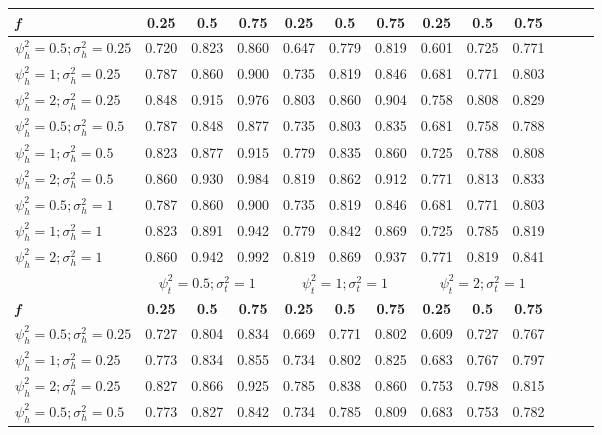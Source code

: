 \begin{table}[ht]
{\begin{tabular}{l c c c c c c c c c c c c}
\cmidrule(lr){2-4} \cmidrule(lr){5-7} \cmidrule(lr){8-10}
\textbf{\textit{f}} & \textbf{0.25} & \textbf{0.5} & \textbf{0.75} & \textbf{0.25} & \textbf{0.5} & \textbf{0.75} & \textbf{0.25} & \textbf{0.5} & \textbf{0.75} \\
\hline
$\psi_h^2 = 0.5; \sigma_h^2 = 0.25$ & 0.720 & 0.823 & 0.860 & 0.647 & 0.779 & 0.819 & 0.601 & 0.725 & 0.771 \\
$\psi_h^2 = 1; \sigma_h^2 = 0.25$ & 0.787 & 0.860 & 0.900 & 0.735 & 0.819 & 0.846 & 0.681 & 0.771 & 0.803 \\
$\psi_h^2 = 2; \sigma_h^2 = 0.25$ & 0.848 & 0.915 & 0.976 & 0.803 & 0.860 & 0.904 & 0.758 & 0.808 & 0.829 \\
$\psi_h^2 = 0.5; \sigma_h^2 = 0.5$ & 0.787 & 0.848 & 0.877 & 0.735 & 0.803 & 0.835 & 0.681 & 0.758 & 0.788 \\
$\psi_h^2 = 1; \sigma_h^2 = 0.5$ & 0.823 & 0.877 & 0.915 & 0.779 & 0.835 & 0.860 & 0.725 & 0.788 & 0.808 \\
$\psi_h^2 = 2; \sigma_h^2 = 0.5$ & 0.860 & 0.930 & 0.984 & 0.819 & 0.862 & 0.912 & 0.771 & 0.813 & 0.833 \\
$\psi_h^2 = 0.5; \sigma_h^2 = 1$ & 0.787 & 0.860 & 0.900 & 0.735 & 0.819 & 0.846 & 0.681 & 0.771 & 0.803 \\
$\psi_h^2 = 1; \sigma_h^2 = 1$ & 0.823 & 0.891 & 0.942 & 0.779 & 0.842 & 0.869 & 0.725 & 0.785 & 0.819 \\
$\psi_h^2 = 2; \sigma_h^2 = 1$ & 0.860 & 0.942 & 0.992 & 0.819 & 0.869 & 0.937 & 0.771 & 0.819 & 0.841 \\
\hline 
 & \multicolumn{3}{c}{$\psi_t^2 = 0.5; \sigma_t^2 = 1$} & \multicolumn{3}{c}{$\psi_t^2 = 1; \sigma_t^2 = 1$} & \multicolumn{3}{c}{$\psi_t^2 = 2; \sigma_t^2 = 1$} \\
\addlinespace[1pt]
\cmidrule(lr){2-4} \cmidrule(lr){5-7} \cmidrule(lr){8-10}
\addlinespace[1pt]
\textbf{\textit{f}} & \textbf{0.25} & \textbf{0.5} & \textbf{0.75} & \textbf{0.25} & \textbf{0.5} & \textbf{0.75} & \textbf{0.25} & \textbf{0.5} & \textbf{0.75} \\
\hline
$\psi_h^2 = 0.5; \sigma_h^2 = 0.25$ & 0.727 & 0.804 & 0.834 & 0.669 & 0.771 & 0.802 & 0.609 & 0.727 & 0.767 \\
$\psi_h^2 = 1; \sigma_h^2 = 0.25$ & 0.773 & 0.834 & 0.855 & 0.734 & 0.802 & 0.825 & 0.683 & 0.767 & 0.797 \\
$\psi_h^2 = 2; \sigma_h^2 = 0.25$ & 0.827 & 0.866 & 0.925 & 0.785 & 0.838 & 0.860 & 0.753 & 0.798 & 0.815 \\
$\psi_h^2 = 0.5; \sigma_h^2 = 0.5$ & 0.773 & 0.827 & 0.842 & 0.734 & 0.785 & 0.809 & 0.683 & 0.753 & 0.782 \\

\end{tabular}}
\end{table}
